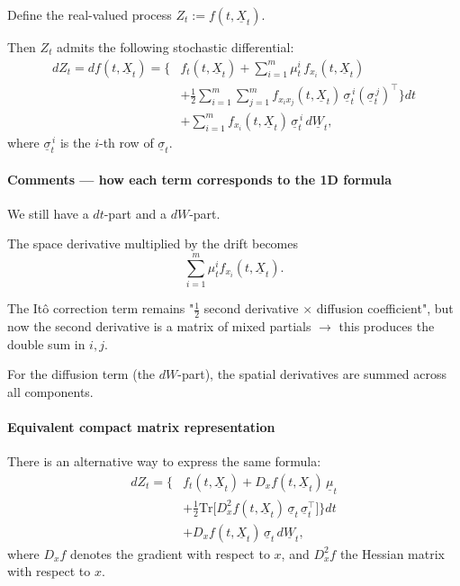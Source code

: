 \documentclass[12pt,a4paper]{article}
\theoremstyle{definition}
\begin{document}
Define the real-valued process $Z_t := f(t, \underline{X}_t)$.

Then $Z_t$ admits the following stochastic differential:
\[
\begin{aligned}
dZ_t = df(t, \underline{X}_t) = \Bigg\{ & f_t(t, \underline{X}_t) + \sum_{i=1}^m \mu_t^i \, f_{x_i}(t, \underline{X}_t) \\
& + \frac{1}{2} \sum_{i=1}^m \sum_{j=1}^m f_{x_i x_j}(t, \underline{X}_t) \, \underline{\sigma}_t^{\,i} (\underline{\sigma}_t^{\,j})^\top \Bigg\} dt \\
& + \sum_{i=1}^m f_{x_i}(t, \underline{X}_t) \, \underline{\sigma}_t^{\,i} \, d\underline{W}_t,
\end{aligned}
\]
where $\underline{\sigma}_t^{\,i}$ is the $i$-th row of $\underline{\sigma}_t$.

\paragraph{Comments — how each term corresponds to the 1D formula}

We still have a $dt$-part and a $dW$-part.

The space derivative multiplied by the drift becomes
\[
\sum_{i=1}^m \mu_t^i f_{x_i}(t, \underline{X}_t).
\]

The Itô correction term remains "$\frac{1}{2}$ second derivative $\times$ diffusion coefficient", but now the second derivative is a matrix of mixed partials $\rightarrow$ this produces the double sum in $i, j$.

For the diffusion term (the $dW$-part), the spatial derivatives are summed across all components.

\paragraph{Equivalent compact matrix representation}

There is an alternative way to express the same formula:
\[
\begin{aligned}
dZ_t = \Bigg\{ & f_t(t, \underline{X}_t) + D_x f(t, \underline{X}_t) \, \underline{\mu}_t \\
& + \frac{1}{2} \text{Tr}\big[D_x^2 f(t, \underline{X}_t) \, \underline{\sigma}_t \, \underline{\sigma}_t^\top\big] \Bigg\} dt \\
& + D_x f(t, \underline{X}_t) \, \underline{\sigma}_t \, d\underline{W}_t,
\end{aligned}
\]
where $D_x f$ denotes the gradient with respect to $x$, and $D_x^2 f$ the Hessian matrix with respect to $x$.
\end{document}
